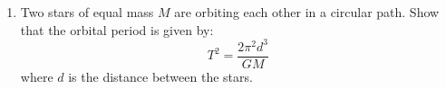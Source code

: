 \documentclass{../../../oss-apphys}
\begin{document}
\begin{enumerate}[leftmargin=15pt]

\item Two stars of equal mass $M$ are orbiting each other in a circular path.
  Show that the orbital period is given by:
  \begin{displaymath}
    T^2=\frac{2\pi^2d^3}{GM}
  \end{displaymath}
  where $d$ is the distance between the stars.
  


\end{enumerate}
\end{document}
